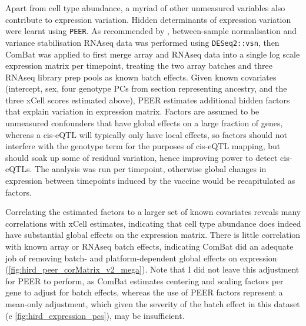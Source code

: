 %
%
Apart from cell type abundance, a myriad of other unmeasured variables also contribute to expression variation.
Hidden determinants of expression variation were learnt using \texttt{PEER}\autocite{stegle2012UsingProbabilisticEstimation}.
As recommended by \autocite{stegle2012UsingProbabilisticEstimation}, between-sample normalisation and variance stabilisation \gls{RNAseq} data was performed using \texttt{DESeq2::vsn},
then ComBat was applied to first merge array and \gls{RNAseq} data into a single log scale expression matrix per timepoint, treating the two array batches and three \gls{RNAseq} library prep pools as known batch effects.
Given known covariates (intercept, sex, four genotype \glspl{PC} from section \todo{} representing ancestry, and the three xCell scores estimated above),
PEER estimates additional hidden factors that explain variation in expression matrix.
Factors are assumed to be unmeasured confounders that have global effects on a large fraction of genes, 
whereas a cis-\gls{eQTL} will typically only have local effects, so factors should not interfere with the genotype term for the purposes of cis-\gls{eQTL} mapping,
but should soak up some of residual variation, hence improving power to detect cis-\glspl{eQTL}.
The analysis was run per timepoint, otherwise global changes in expression between timepoints induced by the vaccine would be recapitulated as factors.

Correlating the estimated factors to a larger set of known covariates reveals many correlations with xCell estimates, indicating that cell type abundance does indeed have substantial global effects on the expression matrix.
There is little correlation with known array or \gls{RNAseq} batch effects, indicating ComBat did an adequate job of removing batch- and platform-dependent global effects on expression (\autoref{fig:hird_peer_corMatrix_v2_mega}).
Note that I did not leave this adjustment for PEER to perform, as ComBat estimates centering and scaling factors per gene to adjust for batch effects, whereas the use of PEER factors represent a mean-only adjustment, which given the severity of the batch effect in this dataset (e \autoref{fig:hird_expression_pcs}), may be insufficient\autocite{zhang2018AlternativeEmpiricalBayes}.

